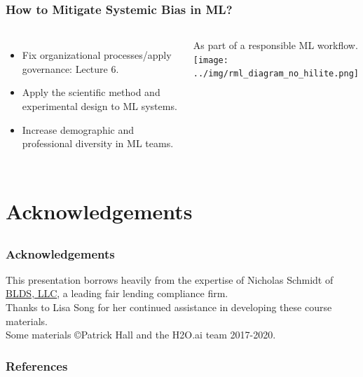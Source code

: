 \documentclass[11pt,aspectratio=169,hyperref={colorlinks}]{beamer}
\begin{document}
		\begin{frame}
		
			\frametitle{How to Mitigate Systemic Bias in ML?}		
			
			\begin{columns}
			
				\begin{itemize}
					\item Fix organizational processes/apply governance: Lecture 6.
					\item Apply the scientific method and experimental design to ML systems. 
					\item Increase demographic and professional diversity in ML teams. 
					
				\end{itemize}
			
				\centering
				\noindent As part of a responsible ML workflow.\\
				\vspace{10pt}
				\texttt{[image: ../img/rml\_diagram\_no\_hilite.png]}
			
			\end{columns}			
			
		\end{frame}		
		
	\section{Acknowledgements}

	\subsection*{}
	
	\begin{frame}
	
		\frametitle{Acknowledgements}
		
		This presentation borrows heavily from the expertise of Nicholas Schmidt of \href{https://www.bldsllc.com/}{BLDS, LLC}, a leading fair lending compliance firm.\\
		\vspace{10pt}		
		Thanks to Lisa Song for her continued assistance in developing these course materials.\\
		\vspace{10pt}
		Some materials \copyright\hspace{1pt}Patrick Hall and the H2O.ai team 2017-2020.  

	\end{frame}	
	

	\begin{frame}[t, allowframebreaks]
	
		\frametitle{References}
		\printbibliography
		
	\end{frame}
\end{document}
